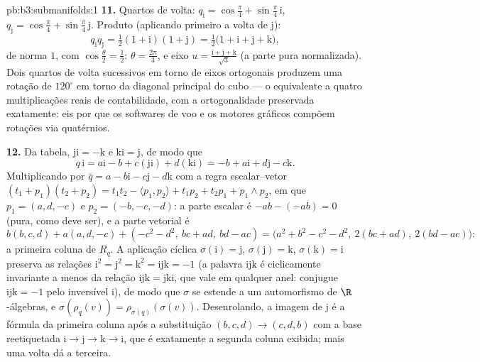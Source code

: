 \begin{solution}{pb:b3:submanifolds:1}
\textbf{11.} Quartos de volta: $q_{\mathrm i} =
\cos\frac\pi4 + \sin\frac\pi4\,\mathrm i$, $q_{\mathrm j} =
\cos\frac\pi4 + \sin\frac\pi4\,\mathrm j$. Produto
(aplicando primeiro a volta de $\mathrm j$):
\[
q_{\mathrm i}q_{\mathrm j} = \tfrac12(1 + \mathrm i)(1 +
\mathrm j) = \tfrac12\bigl(1 + \mathrm i + \mathrm j +
\mathrm k\bigr),
\]
de norma $1$, com $\cos\frac\theta2 = \frac12$: $\theta =
\frac{2\pi}3$, e eixo $u = \frac{\mathrm i + \mathrm j +
\mathrm k}{\sqrt3}$ (a parte pura normalizada). Dois
quartos de volta sucessivos em torno de eixos ortogonais produzem uma
rotação de $120^\circ$ em torno da diagonal principal do cubo --- o equivalente a
quatro multiplicações reais de contabilidade, com a ortogonalidade
preservada exatamente: eis por que os softwares de voo e os motores gráficos
compõem rotações via quatérnios.

\textbf{12.} Da tabela, $\mathrm{ji} = -\mathrm k$ e
$\mathrm{ki} = \mathrm j$, de modo que
\[
q\,\mathrm i = a\mathrm i - b + c(\mathrm{ji}) +
d(\mathrm{ki}) = -b + a\mathrm i + d\mathrm j - c\mathrm k .
\]
Multiplicando por $\bar q = a - b\mathrm i - c\mathrm j -
d\mathrm k$ com a regra escalar--vetor $(t_1 + p_1)(t_2 +
p_2) = t_1t_2 - \langle p_1, p_2\rangle + t_1p_2 + t_2p_1 +
p_1\wedge p_2$, em que $p_1 = (a, d, -c)$ e $p_2 = (-b, -c,
-d)$: a parte escalar é $-ab - (-ab) = 0$ (pura, como deve
ser), e a parte vetorial é
\[
b(b, c, d) + a(a, d, -c) + (-c^2 - d^2,\ bc + ad,\ bd - ac)
= \bigl(a^2 + b^2 - c^2 - d^2,\ 2(bc + ad),\ 2(bd -
ac)\bigr):
\]
a primeira coluna de $R_q$. A aplicação cíclica $\sigma(\mathrm i)
= \mathrm j$, $\sigma(\mathrm j) = \mathrm k$,
$\sigma(\mathrm k) = \mathrm i$ preserva as relações
$\mathrm i^2 = \mathrm j^2 = \mathrm k^2 = \mathrm{ijk} =
-1$ (a palavra $\mathrm{ijk}$ é ciclicamente invariante a menos da
relação $\mathrm{ijk} = \mathrm{jki}$, que vale em
qualquer anel: conjugue $\mathrm{ijk} = -1$ pelo inversível
$\mathrm i$), de modo que $\sigma$ se estende a um automorfismo
de $\R$-álgebras, e $\sigma(\rho_q(v)) =
\rho_{\sigma(q)}(\sigma(v))$. Desenrolando, a imagem de
$\mathrm j$ é a fórmula da primeira coluna após a
substituição $(b, c, d) \to (c, d, b)$ com a base
reetiquetada $\mathrm i \to \mathrm j \to \mathrm k \to \mathrm
i$, que é exatamente a segunda coluna exibida; mais uma
volta dá a terceira.


\end{solution}
